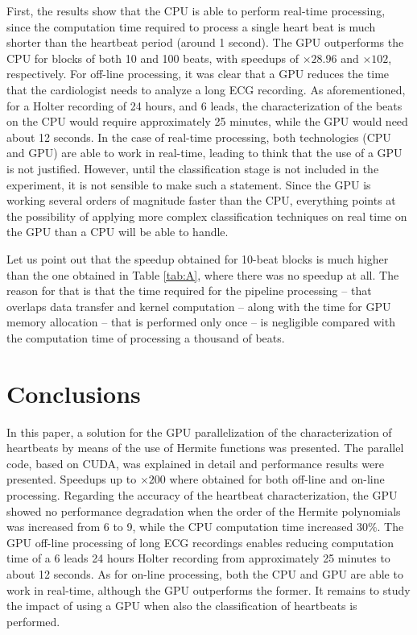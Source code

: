 \documentclass[runningheads]{llncs}
\begin{document}
First, the results show that the CPU is able to perform real-time processing, since the computation time required to process a single heart beat is much shorter than the heartbeat period (around 1 second). The GPU outperforms the CPU for blocks of both 10 and 100 beats, with speedups of $\times 28.96$ and $\times 102$, respectively. For off-line processing, it was clear that a GPU reduces the time that the cardiologist needs to analyze a long ECG recording. As aforementioned, for a Holter recording of 24 hours, and 6 leads, the characterization of the beats on the CPU would require approximately 25 minutes, while the GPU would need about 12 seconds. In the case of  real-time processing, both technologies (CPU and GPU) are able to work in real-time, leading to think that the use of a GPU is not justified. However, until the classification stage is not included in the experiment, it is not sensible to make such a statement. Since the GPU is working several orders of magnitude faster than the CPU, everything points at the possibility of applying more complex classification techniques on real time on the GPU than a CPU will be able to handle.

Let us point out that the speedup obtained for 10-beat blocks is much higher than the one obtained in Table \ref{tab:A}, where there was no speedup at all. The reason for that is that the time required for the pipeline processing -- that overlaps data transfer and kernel computation -- along with the time for GPU memory allocation -- that is performed only once -- is negligible compared with the computation time of processing a thousand of beats.

\section{Conclusions}\label{s:conclusions}
In this paper, a solution for the GPU parallelization of the characterization of heartbeats by means of the use of Hermite functions was presented. The parallel code, based on CUDA, was explained in detail and performance results were presented. Speedups up to $\times 200$ where obtained for both off-line and on-line processing. Regarding the accuracy of the heartbeat characterization, the GPU showed no performance degradation when the order of the Hermite polynomials was increased from 6 to 9, while the CPU computation time increased $30 \%$. The GPU off-line processing of long ECG recordings enables reducing computation time of a 6 leads 24 hours Holter recording from approximately 25 minutes to about 12 seconds. As for on-line processing, both the CPU and GPU are able to work in real-time, although the GPU outperforms the former. It remains to study the impact of using a GPU when also the classification of heartbeats is performed. 
\end{document}
